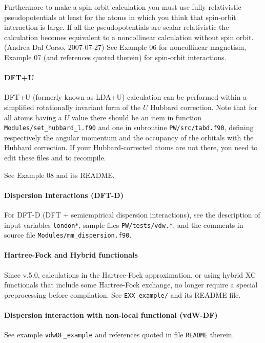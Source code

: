 \documentclass[12pt,a4paper]{article}
\begin{document}
Furthermore to make a spin-orbit calculation you must use fully
relativistic pseudopotentials at least for the atoms in which you
think that spin-orbit interaction is large. If all the pseudopotentials 
are scalar
relativistic the calculation becomes equivalent to a noncollinear
calculation without spin orbit. (Andrea Dal Corso, 2007-07-27)
See Example 06 for noncollinear magnetism, Example 07 (and references
quoted therein) for spin-orbit interactions.

\paragraph{DFT+U}
DFT+U (formerly known as LDA+U) calculation can be
performed within a simplified rotationally invariant form 
of the $U$ Hubbard correction. Note that for all atoms having 
a $U$ value there should be an item in function
\texttt{Modules/set\_hubbard\_l.f90} and one in 
subroutine \texttt{PW/src/tabd.f90}, defining respectively
the angular momentum and the occupancy of the orbitals with
the Hubbard correction. If your Hubbard-corrected atoms are not
there, you need to edit these files and to recompile.

See Example 08 and its README.

\paragraph{Dispersion Interactions (DFT-D)}
For DFT-D (DFT + semiempirical dispersion interactions), see the
description of input variables \texttt{london*}, sample files
\texttt{PW/tests/vdw.*}, and the comments in source file
\texttt{Modules/mm\_dispersion.f90}.

\paragraph{Hartree-Fock and Hybrid functionals}

Since v.5.0, calculations in the Hartree-Fock approximation, or using 
hybrid XC functionals that include some Hartree-Fock exchange, no longer
require a special preprocessing before compilation.
See \texttt{EXX\_example/} and its README file.

\paragraph{Dispersion interaction with non-local functional (vdW-DF)}
See example \texttt{vdwDF\_example} 
and references
quoted in file \texttt{README} therein.
\end{document}
